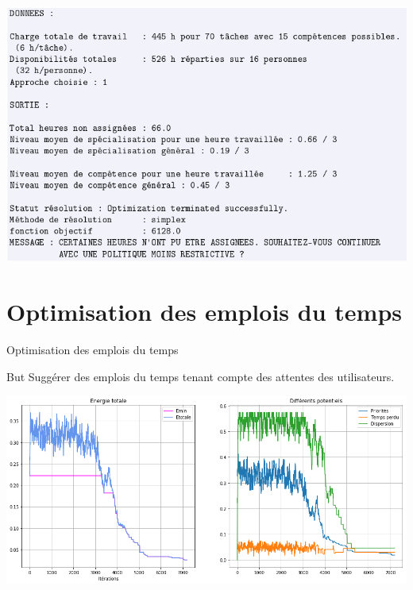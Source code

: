 \documentclass[french]{beamer}
\begin{document}
\begin{frame}
\includegraphics[width=0.9\textwidth>]{oadt1}
\end{frame}


\section{Optimisation des emplois du temps}
\begin{frame}{Optimisation des emplois du temps}
\begin{block}{But}
Suggérer des emplois du temps tenant compte des attentes des utilisateurs.
\end{block}
\end{frame}

\begin{frame}
\includegraphics[width=0.9\textwidth>]{oedt1}
\end{frame}
\end{document}
